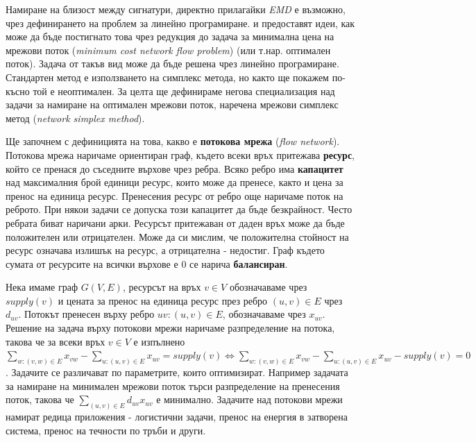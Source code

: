 \documentclass[a4paper,12pt]{article}
\begin{document}
\bigbreak

Намиране на близост между сигнатури, директно прилагайки \textit{EMD} е възможно, чрез дефинирането на проблем за линейно програмиране. \cite{metricfordistributionsforims} и \cite{imretrievalwithoutsegmentation} предоставят идеи, как може да бъде постигнато това чрез редукция до задача за минимална цена на мрежови поток (\textit{minimum cost network flow problem}) (или т.нар. оптимален поток). Задача от такъв вид може да бъде решена чрез линейно програмиране. Стандартен метод е използването на симплекс метода, но както ще покажем по-късно той е неоптимален. За целта ще дефинираме негова специализация над задачи за намиране на оптимален мрежови поток, наречена мрежови симплекс метод (\textit{network simplex method}).

\bigbreak

Ще започнем с дефиницията на това, какво е \textbf{потокова мрежа} (\textit{flow network}). Потокова мрежа наричаме ориентиран граф, където всеки връх притежава \textbf{ресурс}, който се пренася до съседните върхове чрез ребра. Всяко ребро има \textbf{капацитет} над максималния брой единици ресурс, които може да пренесе, както и цена за пренос на единица ресурс. Пренесения ресурс от ребро още наричаме поток на реброто. При някои задачи се допуска този капацитет да бъде безкрайност. Често ребрата биват наричани арки. Ресурсът притежаван от даден връх може да бъде положителен или отрицателен. Може да си мислим, че положителна стойност на ресурс означава излишък на ресурс, а отрицателна - недостиг. Граф където сумата от ресурсите на всички върхове е $0$ се нарича \textbf{балансиран}. 

\bigbreak

Нека имаме граф $G(V, E)$, ресурсът на връх $v \in V$ обозначаваме чрез $supply(v)$ и цената за пренос на единица ресурс през ребро $(u, v) \in E$ чрез $d_{uv}$. Потокът пренесен върху ребро $uv: (u, v) \in E$, обозначаваме чрез $x_{uv}$. Решение на задача върху потокови мрежи наричаме разпределение на потока, такова че за всеки връх $v \in V$ е изпълнено $\sum_{w: (v, w) \in E} x_{vw} - \sum_{u: (u, v) \in E} x_{uv} = supply(v) \iff \sum_{w: (v, w) \in E} x_{vw} - \sum_{u: (u, v) \in E} x_{uv} - supply(v) = 0$. Задачите се различават по параметрите, които оптимизират. Например задачата за намиране на минимален мрежови поток търси разпределение на пренесения поток, такова че $\sum_{(u, v) \in E} d_{uv} x_{uv}$ е минимално. Задачите над потокови мрежи намират редица приложения - логистични задачи, пренос на енергия в затворена система, пренос на течности по тръби и други.
\end{document}
